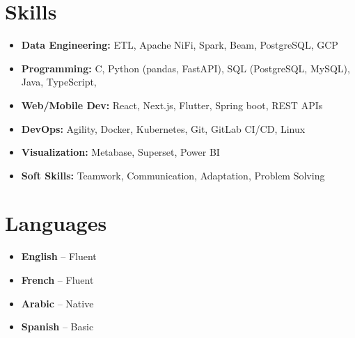 \documentclass[10pt,a4paper,sans]{moderncv}
\begin{document}
    \vspace{-14pt}
    \section{Skills}
    \vspace{-2pt}
    \begin{itemize}[leftmargin=0.5cm, itemsep=0pt, topsep=0pt]
    \item \textbf{Data Engineering:} ETL, Apache NiFi, Spark, Beam, PostgreSQL, GCP
    \item \textbf{Programming:} C, Python (pandas, FastAPI), SQL (PostgreSQL, MySQL), Java, TypeScript, 
    \item \textbf{Web/Mobile Dev:} React, Next.js, Flutter, Spring boot, REST APIs
    \item \textbf{DevOps:} Agility, Docker, Kubernetes, Git, GitLab CI/CD, Linux
    \item \textbf{Visualization:} Metabase, Superset, Power BI
    \item \textbf{Soft Skills:} Teamwork, Communication, Adaptation, Problem Solving
    \end{itemize}

 
\vspace{-15pt}
\section{Languages}
\vspace{-15pt}
\begin{multicols}{2}
\begin{itemize}[leftmargin=0.3cm, itemsep=0pt, topsep=0pt, partopsep=0pt, parsep=0pt]
    \item \textbf{English} – Fluent
    \item \textbf{French} – Fluent
    \item \textbf{Arabic} – Native
    \item \textbf{Spanish} – Basic
\end{itemize}
\end{multicols}
\vspace{-8pt}
\end{document}
